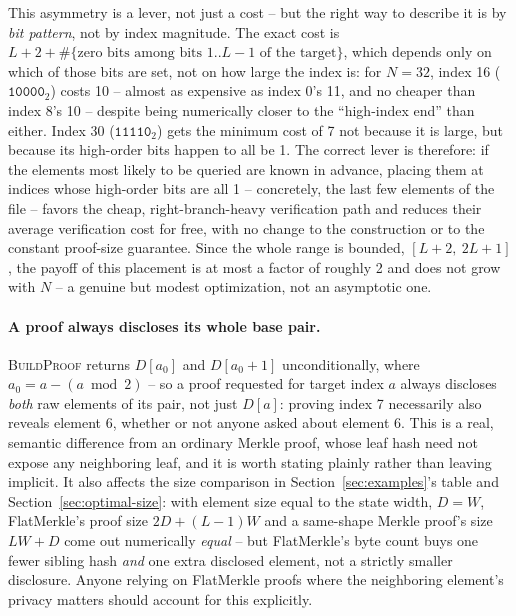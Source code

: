 This asymmetry is a lever, not just a cost -- but the right way to describe
it is by \emph{bit pattern}, not by index magnitude. The exact cost is
$L + 2 + \#\{\text{zero bits among bits } 1..L{-}1 \text{ of the target}\}$,
which depends only on which of those bits are set, not on how large the
index is: for $N=32$, index 16 ($\texttt{10000}_2$) costs 10 -- almost as
expensive as index 0's 11, and no cheaper than index 8's 10 -- despite
being numerically closer to the ``high-index end'' than either. Index 30
($\texttt{11110}_2$) gets the minimum cost of 7 not because it is large,
but because its high-order bits happen to all be 1. The correct lever is
therefore: if the elements most likely to be queried are known in advance,
placing them at indices whose high-order bits are all 1 -- concretely, the
last few elements of the file -- favors the cheap, right-branch-heavy
verification path and reduces their average verification cost for free,
with no change to the construction or to the constant proof-size
guarantee. Since the whole range is bounded, $[L+2,\ 2L+1]$, the payoff of
this placement is at most a factor of roughly 2 and does not grow with
$N$ -- a genuine but modest optimization, not an asymptotic one.

\paragraph{A proof always discloses its whole base pair.}
\label{par:pair-disclosure}
\textsc{BuildProof} returns $D[a_0]$ and $D[a_0{+}1]$ unconditionally, where
$a_0 = a - (a \bmod 2)$ -- so a proof requested for target index $a$ always
discloses \emph{both} raw elements of its pair, not just $D[a]$: proving
index 7 necessarily also reveals element 6, whether or not anyone asked
about element 6. This is a real, semantic difference from an ordinary
Merkle proof, whose leaf hash need not expose any neighboring leaf, and it
is worth stating plainly rather than leaving implicit. It also affects the
size comparison in Section~\ref{sec:examples}'s table and
Section~\ref{sec:optimal-size}: with element size equal to the state width,
$D=W$, FlatMerkle's proof size $2D + (L-1)W$ and a same-shape Merkle
proof's size $LW + D$ come out numerically \emph{equal} -- but FlatMerkle's
byte count buys one fewer sibling hash \emph{and} one extra disclosed
element, not a strictly smaller disclosure. Anyone relying on FlatMerkle
proofs where the neighboring element's privacy matters should account for
this explicitly.
